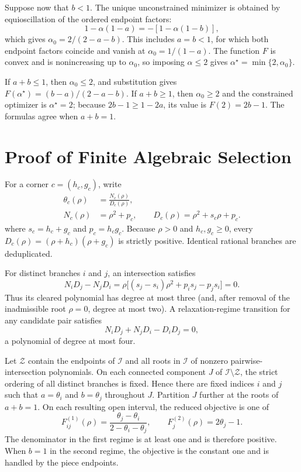 \documentclass[pdflatex,iicol,sn-mathphys-num]{sn-jnl}
\theoremstyle{definition}
\begin{document}
Suppose now that $b<1$. The unique unconstrained minimizer is obtained by
equioscillation of the ordered endpoint factors:
\[
1-\alpha(1-a)=-[1-\alpha(1-b)],
\]
which gives $\alpha_0=2/(2-a-b)$. This includes $a=b<1$, for which both
endpoint factors coincide and vanish at $\alpha_0=1/(1-a)$.
The function $F$ is convex and is nonincreasing up to $\alpha_0$, so imposing
$\alpha\le2$ gives $\alpha^\star=\min\{2,\alpha_0\}$.

If $a+b\le1$, then $\alpha_0\le2$, and substitution gives
$F(\alpha^\star)=(b-a)/(2-a-b)$. If $a+b\ge1$, then
$\alpha_0\ge2$ and the constrained optimizer is $\alpha^\star=2$; because
$2b-1\ge1-2a$, its value is $F(2)=2b-1$. The formulas agree when
$a+b=1$.

\section{Proof of Finite Algebraic Selection}\label{app:finite}
For a corner $c=(h_c,g_c)$, write
\begin{align}
\theta_c(\rho)&=\frac{N_c(\rho)}{D_c(\rho)},\nonumber\\
N_c(\rho)&=\rho^2+p_c,\qquad
D_c(\rho)=\rho^2+s_c\rho+p_c.
\end{align}
where $s_c=h_c+g_c$ and $p_c=h_cg_c$. Because $\rho>0$ and
$h_c,g_c\ge0$, every $D_c(\rho)=(\rho+h_c)(\rho+g_c)$ is strictly positive.
Identical rational branches are deduplicated.

For distinct branches $i$ and $j$, an intersection satisfies
\[
N_iD_j-N_jD_i
=\rho\big[(s_j-s_i)\rho^2+p_i s_j-p_j s_i\big]=0.
\]
Thus its cleared polynomial has degree at most three (and, after removal of
the inadmissible root $\rho=0$, degree at most two). A relaxation-regime
transition for any candidate pair satisfies
\[
N_iD_j+N_jD_i-D_iD_j=0,
\]
a polynomial of degree at most four.

Let $\mathcal Z$ contain the endpoints of $\mathcal I$ and all roots in
$\mathcal I$ of nonzero pairwise-intersection polynomials. On each connected
component $J$ of $\mathcal I\setminus\mathcal Z$, the strict ordering of all
distinct branches is fixed. Hence there are fixed indices $i$ and $j$ such
that $a=\theta_i$ and $b=\theta_j$ throughout $J$. Partition $J$ further at
the roots of $a+b=1$. On each resulting open interval, the reduced objective
is one of
\[
F_{ij}^{(1)}(\rho)
=\frac{\theta_j-\theta_i}{2-\theta_i-\theta_j},
\qquad
F_j^{(2)}(\rho)=2\theta_j-1.
\]
The denominator in the first regime is at least one and is therefore positive.
When $b=1$ in the second regime, the objective is the constant one and is
handled by the piece endpoints.
\end{document}
